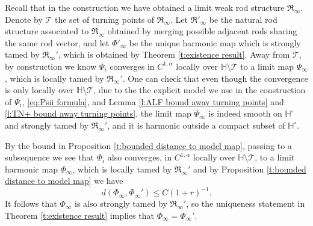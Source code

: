 \documentclass[a4paper,11pt]{amsart}
\theoremstyle{definition}
\numberwithin{equation}{section}
\newcommand{\dH}{\mathbb{H}}
\newcommand{\mR} {\mathfrak R}
\begin{document}
Recall that in the construction we have obtained a limit weak rod structure $\mR_\infty$. Denote by $\mathcal T$ the set of turning points of $\mR_\infty$. Let $\mR'_\infty$ be the natural rod structure associated to $\mR_\infty$ obtained by merging possible adjacent rods sharing the same rod vector, and let $\Phi'_\infty$ be the unique harmonic map which is strongly tamed by $\mR_\infty'$, which is obtained by Theorem \ref{t:existence result}. 
Away from $\mathcal T$, by construction we know $\Psi_i$ converges in $C^{1, \alpha}$ locally over $\dH\setminus \mathcal T$ to a limit map $\Psi_\infty$, which is locally tamed by $\mR_\infty'$. One can check that even though the convergence is only locally over $\dH\setminus \mathcal T$, due to the the explicit model we use in the construction of $\Psi_i$, \eqref{eq:Psii formula}, and Lemma \ref{l:ALF bound away turning points} and \ref{l:TN+ bound away turning points}, the limit map $\Psi_\infty$ is indeed smooth on $\dH^\circ$ and strongly tamed by $\mR_\infty'$, and it is harmonic outside a compact subset of $\dH^\circ$.

By the bound in Proposition \ref{t:bounded distance to model map}, passing to a subsequence we see that $\Phi_i$ also converges, in $C^{1, \alpha}$ locally over $\dH\setminus \mathcal T$, to a limit harmonic map $\Phi_\infty$, which is locally tamed by $\mR_\infty'$ and by Proposition \ref{t:bounded distance to model map} we have 
$$d(\Phi_\infty, \Phi_\infty')\leq C(1+r)^{-1}.$$
It follows that $\Phi_\infty$ is also strongly tamed by $\mR_\infty'$, so the uniqueness statement in Theorem \ref{t:existence result} implies that $\Phi_\infty=\Phi_\infty'$. 
\end{document}
